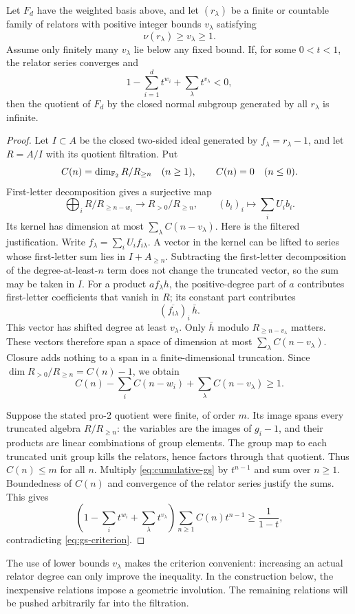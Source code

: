 \begin{lemma}\label{lem:weighted-gs}
Let $F_d$ have the weighted basis above, and let $(r_\lambda)$ be a finite or countable family of relators with positive integer bounds $v_\lambda$ satisfying
\[
 \nu(r_\lambda)\ge v_\lambda\ge1.
\]
Assume only finitely many $v_\lambda$ lie below any fixed bound. If, for some $0<t<1$, the relator series converges and
\begin{equation}\label{eq:gs-criterion}
 1-\sum_{i=1}^d t^{w_i}+\sum_\lambda t^{v_\lambda}<0,
\end{equation}
then the quotient of $F_d$ by the closed normal subgroup generated by all $r_\lambda$ is infinite.
\end{lemma}

\begin{proof}
Let $I\subset A$ be the closed two-sided ideal generated by $f_\lambda=r_\lambda-1$, and let $R=A/I$ with its quotient filtration. Put
\[
 C(n)=\dim_{\mathbb F_2}R/R_{\ge n}\quad(n\ge1),
 \qquad C(n)=0\quad(n\le0).
\]
First-letter decomposition gives a surjective map
\[
 \bigoplus_i R/R_{\ge n-w_i}\longrightarrow
 R_{>0}/R_{\ge n},\qquad
 (b_i)_i\longmapsto\sum_i U_i b_i.
\]
Its kernel has dimension at most $\sum_\lambda C(n-v_\lambda)$. Here is the filtered justification. Write $f_\lambda=\sum_i U_i f_{i\lambda}$. A vector in the kernel can be lifted to series whose first-letter sum lies in $I+A_{\ge n}$. Subtracting the first-letter decomposition of the degree-at-least-$n$ term does not change the truncated vector, so the sum may be taken in $I$. For a product $a f_\lambda h$, the positive-degree part of $a$ contributes first-letter coefficients that vanish in $R$; its constant part contributes
\[
 (\overline{f_{i\lambda}})_i\,\bar h.
\]
This vector has shifted degree at least $v_\lambda$. Only $\bar h$ modulo $R_{\ge n-v_\lambda}$ matters. These vectors therefore span a space of dimension at most $\sum_\lambda C(n-v_\lambda)$. Closure adds nothing to a span in a finite-dimensional truncation. Since $\dim R_{>0}/R_{\ge n}=C(n)-1$, we obtain
\begin{equation}\label{eq:cumulative-gs}
 C(n)-\sum_i C(n-w_i)+\sum_\lambda C(n-v_\lambda)\ge1.
\end{equation}

Suppose the stated pro-2 quotient were finite, of order $m$. Its image spans every truncated algebra $R/R_{\ge n}$: the variables are the images of $g_i-1$, and their products are linear combinations of group elements. The group map to each truncated unit group kills the relators, hence factors through that quotient. Thus $C(n)\le m$ for all $n$.
Multiply \eqref{eq:cumulative-gs} by $t^{n-1}$ and sum over $n\ge1$. Boundedness of $C(n)$ and convergence of the relator series justify the sums. This gives
\[
 \left(1-\sum_i t^{w_i}+\sum_\lambda t^{v_\lambda}\right)
 \sum_{n\ge1}C(n)t^{n-1}\ge\frac1{1-t},
\]
contradicting \eqref{eq:gs-criterion}.
\end{proof}

The use of lower bounds $v_\lambda$ makes the criterion convenient: increasing an actual relator degree can only improve the inequality. In the construction below, the inexpensive relations impose a geometric involution. The remaining relations will be pushed arbitrarily far into the filtration.
